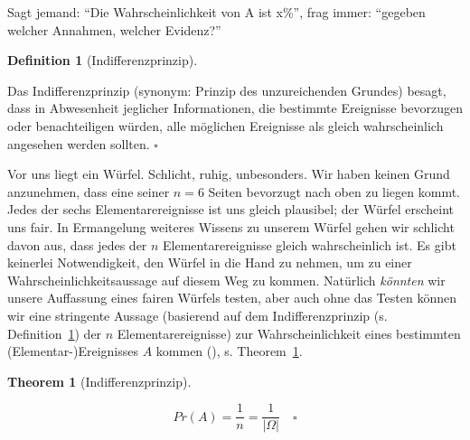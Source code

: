 \documentclass[
  ngerman,
  letterpaper,
  twoside,
  open=any]{scrbook}
\theoremstyle{definition}
\theoremstyle{plain}
\newtheorem{theorem}{Theorem}[chapter]
\theoremstyle{definition}
\theoremstyle{definition}
\newtheorem{definition}{Definition}[chapter]
\theoremstyle{remark}
\begin{document}
\begin{tcolorbox}[enhanced jigsaw, arc=.35mm, bottomrule=.15mm, bottomtitle=1mm, breakable, colback=white, colbacktitle=quarto-callout-note-color!10!white, colframe=quarto-callout-note-color-frame, coltitle=black, left=2mm, leftrule=.75mm, opacityback=0, opacitybacktitle=0.6, rightrule=.15mm, title=\textcolor{quarto-callout-note-color}{\faInfo}\hspace{0.5em}{Hinweis}, titlerule=0mm, toprule=.15mm, toptitle=1mm]

Sagt jemand: \enquote{Die Wahrscheinlichkeit von A ist x\%}, frag immer:
\enquote{gegeben welcher Annahmen, welcher Evidenz?}

\end{tcolorbox}

\begin{definition}[Indifferenzprinzip]\protect\hypertarget{def-indifferenzprinzip}{}\label{def-indifferenzprinzip}

Das Indifferenzprinzip (synonym: Prinzip des unzureichenden Grundes)
besagt, dass in Abwesenheit jeglicher Informationen, die bestimmte
Ereignisse bevorzugen oder benachteiligen würden, alle möglichen
Ereignisse als gleich wahrscheinlich angesehen werden sollten.
\(\square\)

\end{definition}

Vor uns liegt ein Würfel. Schlicht, ruhig, unbesonders. Wir haben keinen
Grund anzunehmen, dass eine seiner \(n=6\) Seiten bevorzugt nach oben zu
liegen kommt. Jedes der sechs Elementarereignisse ist uns gleich
plausibel; der Würfel erscheint uns fair. In Ermangelung weiteres
Wissens zu unserem Würfel gehen wir schlicht davon aus, dass jedes der
\(n\) Elementarereignisse gleich wahrscheinlich ist. Es gibt keinerlei
Notwendigkeit, den Würfel in die Hand zu nehmen, um zu einer
Wahrscheinlichkeitsaussage auf diesem Weg zu kommen. Natürlich
\emph{könnten} wir unsere Auffassung eines fairen Würfels testen, aber
auch ohne das Testen können wir eine stringente Aussage (basierend auf
dem Indifferenzprinzip (s. Definition~\ref{def-indifferenzprinzip}) der
\(n\) Elementarereignisse) zur Wahrscheinlichkeit eines bestimmten
(Elementar-)Ereignisses \(A\) kommen (), s. Theorem~\ref{thm-briggs}.

\begin{theorem}[Indifferenzprinzip]\protect\hypertarget{thm-briggs}{}\label{thm-briggs}

\[Pr(A) = \frac{1}{n}= \frac{1}{|\Omega|} \quad \square\]

\end{theorem}
\end{document}
